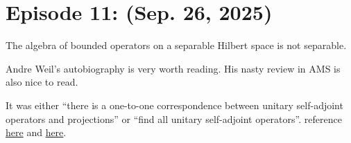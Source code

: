 \section{Episode 11: (Sep. 26, 2025)}
\begin{exercise}
    The algebra of bounded operators on a separable Hilbert space is not separable.
\end{exercise}
\noindent Andre Weil's autobiography is very worth reading. His nasty review in AMS is also nice to read.
\begin{exercise}
    It was either ``there is a one-to-one correspondence between unitary self-adjoint operators and projections'' or ``find all unitary self-adjoint operators''. reference \href{https://personal.math.ubc.ca/~feldman/m511/unboundedReview.pdf}{here} and \href{https://en.wikipedia.org/wiki/Stone%27s_theorem_on_one-parameter_unitary_groups}{here}.
\end{exercise}
\begin{exercise}
    
\end{exercise}